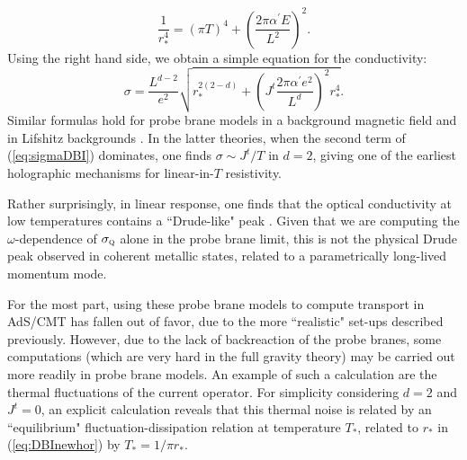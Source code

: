 \documentclass[10pt, oneside]{book}
\begin{document}
\begin{doublespace}
\begin{equation}
\frac{1}{r_*^4}  = (\pi T)^4 + \left(\frac{2\pi\alpha^\prime E}{L^2}\right)^2.   \label{eq:DBInewhor}
\end{equation}
Using the right hand side, we obtain a simple equation for the conductivity: \begin{equation}
\sigma = \frac{L^{d-2}}{e^2}\sqrt{r_*^{2(2-d)} + \left(J^t \frac{2\pi\alpha^\prime e^2}{L^{d}}\right)^2 r_*^4}.   \label{eq:sigmaDBI}
\end{equation}
Similar formulas hold for probe brane models in a background magnetic field \cite{O'Bannon:2007in} and in Lifshitz backgrounds \cite{Hartnoll:2009ns}.    In the latter theories, when the second term of (\ref{eq:sigmaDBI}) dominates, one finds $\sigma \sim J^t/T$ in $d=2$, giving one of the earliest holographic mechanisms for linear-in-$T$ resistivity.

Rather surprisingly, in linear response, one finds that the optical conductivity at low temperatures contains a ``Drude-like" peak \cite{Hartnoll:2009ns}.   Given that we are computing the $\omega$-dependence of $\sigma_{\textsc{q}}$ alone in the probe brane limit, this is not the physical Drude peak observed in coherent metallic states, related to a parametrically long-lived momentum mode.

For the most part, using these probe brane models to compute transport in AdS/CMT has fallen out of favor,  due to the more ``realistic" set-ups described previously.   However, due to the lack of backreaction of the probe branes, some computations (which are very hard in the full gravity theory) may be carried out more readily in probe brane models.  An example of such a calculation are the thermal fluctuations of the current operator.  For simplicity considering $d=2$ and $J^t=0$, an explicit calculation \cite{Sonner:2012if} reveals that this thermal noise is related by an ``equilibrium" fluctuation-dissipation relation at temperature $T_*$, related to $r_*$ in (\ref{eq:DBInewhor}) by $T_* = 1/\pi r_*$.




\end{doublespace}
\end{document}

